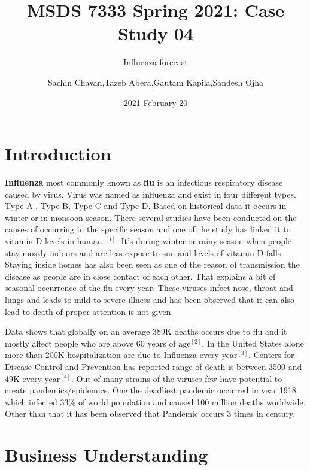 \documentclass[
]{article}
\title{MSDS 7333 Spring 2021: Case Study 04}
\subtitle{Influenza forecast}
\author{Sachin Chavan,Tazeb Abera,Gautam Kapila,Sandesh Ojha}
\date{2021 February 20}
\begin{document}
\maketitle

\hypertarget{introduction}{%
\section{Introduction}\label{introduction}}

\textbf{Influenza} most commonly known as \textbf{flu} is an infectious
respiratory disease caused by virus. Virus was named as influenza and
exist in four different types. Type A , Type B, Type C and Type D. Based
on historical data it occurs in winter or in monsoon season. There
several studies have been conducted on the causes of occurring in the
specific season and one of the study has linked it to vitamin D levels
in human \(^{[1]}\). It's during winter or rainy season when people stay
mostly indoors and are less expose to sun and levels of vitamin D falls.
Staying inside homes has also been seen as one of the reason of
transmission the disease as people are in close contact of each other.
That explains a bit of seasonal occurrence of the flu every year. These
viruses infect nose, throat and lungs and leads to mild to severe
illness and has been observed that it can also lead to death of proper
attention is not given.

Data shows that globally on an average 389K deaths occurs due to flu and
it mostly affect people who are above 60 years of age\(^{[2]}\). In the
United States alone more than 200K hospitalization are due to Influenza
every year\(^{[3]}\).
\href{Centers\%20for\%20Disease\%20Control\%20and\%20Prevention}{Centers
for Disease Control and Prevention} has reported range of death is
between 3500 and 49K every year\(^{[4]}\). Out of many strains of the
viruses few have potential to create pandemics/epidemics. One the
deadliest pandemic occurred in year 1918 which infected 33\% of world
population and caused 100 million deaths worldwide. Other than that it
has been observed that Pandemic occurs 3 times in century.

\newpage

\hypertarget{business-understanding}{%
\section{Business Understanding}\label{business-understanding}}

\newpage
\end{document}
